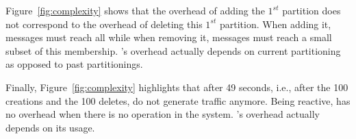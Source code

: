 \begin{asparadesc}
\noindent Figure~\ref{fig:complexity} shows that the overhead of
adding the $1^{st}$ partition does not correspond to the overhead of
deleting this $1^{st}$ partition. When adding it, messages must reach
all \processes while when removing it, messages must reach a small
subset of this membership.  \NAME's overhead actually depends on
current partitioning as opposed to past partitionings.

\noindent Finally, Figure~\ref{fig:complexity} highlights that after
49 seconds, i.e., after the 100 creations and the 100 deletes, \processes
do not generate traffic anymore. Being reactive, \NAME has no overhead
 when there is no operation in the system. \NAME's overhead actually
depends on its usage.

\end{asparadesc}



